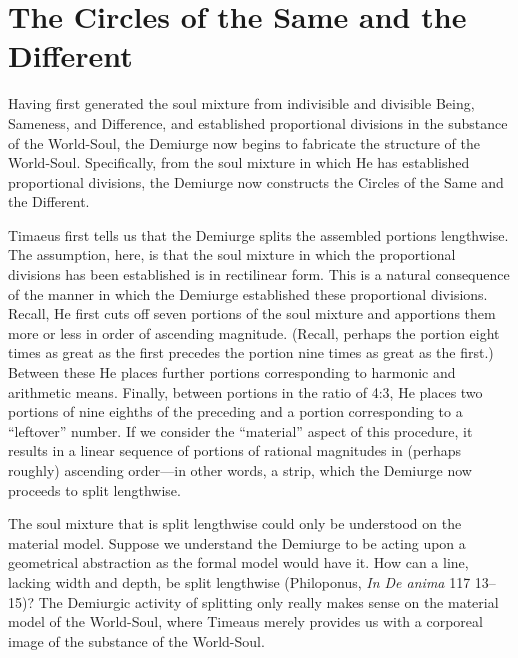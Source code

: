 
\section{The Circles of the Same and the Different} %
\label{sec:the_circles_of_the_same_and_the_different}

Having first generated the soul mixture from indivisible and divisible Being, Sameness, and Difference, and established proportional divisions in the substance of the World-Soul, the Demiurge now begins to fabricate the structure of the World-Soul. Specifically, from the soul mixture in which He has established proportional divisions, the Demiurge now constructs the Circles of the Same and the Different.

Timaeus first tells us that the Demiurge splits the assembled portions lengthwise. The assumption, here, is that the soul mixture in which the proportional divisions has been established is in rectilinear form. This is a natural consequence of the manner in which the Demiurge established these proportional divisions. Recall, He first cuts off seven portions of the soul mixture and apportions them more or less in order of ascending magnitude. (Recall, perhaps the portion eight times as great as the first precedes the portion nine times as great as the first.) Between these He places further portions corresponding to harmonic and arithmetic means. Finally, between portions in the ratio of 4:3, He places two portions of nine eighths of the preceding and a portion corresponding to a ``leftover'' number. If we consider the ``material'' aspect of this procedure, it results in a linear sequence of portions of rational magnitudes in (perhaps roughly) ascending order---in other words, a strip, which the Demiurge now proceeds to split lengthwise.

The soul mixture that is split lengthwise could only be understood on the material model. Suppose we understand the Demiurge to be acting upon a geometrical abstraction as the formal model would have it. How can a line, lacking width and depth, be split lengthwise (Philoponus, \emph{In De anima} 117 13--15)? The Demiurgic activity of splitting only really makes sense on the material model of the World-Soul, where Timeaus merely provides us with a corporeal image of the substance of the World-Soul.

